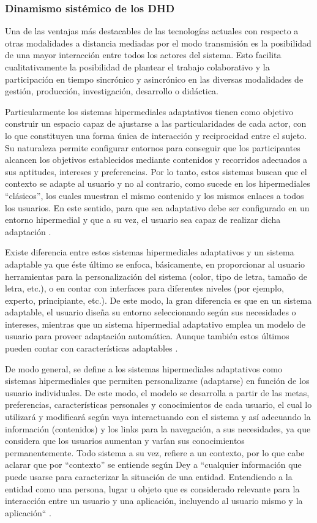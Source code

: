 \subsubsection{Dinamismo sistémico de los DHD}


Una de las ventajas más destacables de las tecnologías actuales con
respecto a otras modalidades a distancia mediadas por el modo transmisión es
la posibilidad de una mayor interacción entre todos los actores del sistema.
Esto facilita cualitativamente la posibilidad de plantear el trabajo
colaborativo y la participación en tiempo sincrónico y asincrónico en las
diversas modalidades de gestión, producción, investigación, desarrollo o
didáctica.


Particularmente los sistemas hipermediales adaptativos tienen como
objetivo construir un espacio capaz de ajustarse a las particularidades de cada
actor, con lo que constituyen una forma única de interacción y reciprocidad
entre el sujeto. Su naturaleza permite configurar entornos para conseguir que
los participantes alcancen los objetivos establecidos mediante contenidos y
recorridos adecuados a sus aptitudes, intereses y preferencias.
Por lo tanto, estos sistemas buscan que el contexto se adapte al usuario y
no al contrario, como sucede en los hipermediales “clásicos”, los cuales
muestran el mismo contenido y los mismos enlaces a todos los usuarios. En
este sentido, para que sea adaptativo debe ser configurado en un entorno
hipermedial y que a su vez, el usuario sea capaz de realizar dicha adaptación
\cite{lxxviii}.


Existe diferencia entre estos sistemas hipermediales adaptativos y un
sistema adaptable ya que éste último se enfoca, básicamente, en proporcionar
al usuario herramientas para la personalización del sistema (color, tipo de
letra, tamaño de letra, etc.), o en contar con interfaces para diferentes
niveles (por ejemplo, experto, principiante, etc.). De este modo, la gran
diferencia es que en un sistema adaptable, el usuario diseña su entorno
seleccionando según sus necesidades o intereses, mientras que un sistema
hipermedial adaptativo emplea un modelo de usuario para proveer adaptación
automática. Aunque también estos últimos pueden contar con características
adaptables \cite{lxxviii}.

De modo general, se define a los sistemas hipermediales adaptativos
como sistemas hipermediales que permiten personalizarse (adaptarse) en
función de los usuario individuales. De este modo, el modelo se desarrolla a
partir de las metas, preferencias, características personales y conocimientos de
cada usuario, el cual lo utilizará y modificará según vaya interactuando con el
sistema y así adecuando la información (contenidos) y los links para la
navegación, a sus necesidades, ya que considera que los usuarios aumentan y
varían sus conocimientos permanentemente. Todo sistema a su vez, refiere a un
contexto, por lo que cabe aclarar que por “contexto” se entiende según Dey
a  ``cualquier información que puede usarse para caracterizar la situación de
una entidad. Entendiendo a la entidad como una persona, lugar u objeto
que es considerado relevante para la interacción entre un usuario y una
aplicación, incluyendo al usuario mismo y la aplicación`` \cite{lxxix}.

